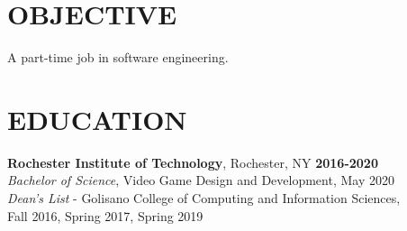 \documentclass[line,margin]{res}
\begin{document}

\noindent
\makebox[0pt][l]{}%
\makebox[\textwidth][c]{}%
\makebox[0pt][l]{}%
\makebox[\textwidth][c]{}%
\makebox[0pt][l]{}%
\makebox[\textwidth][c]{}%



\begin{resume}

\section{OBJECTIVE}
A part-time job in software engineering.



\section{EDUCATION}
\textbf{Rochester Institute of Technology}, Rochester, NY\hfill
    \textbf{2016-2020}\\
{\sl Bachelor of Science}, Video Game Design and Development, May 2020
\\
{\sl Dean's List} - Golisano College of Computing and Information Sciences,\hfill \\ Fall 2016, Spring 2017, Spring 2019

\end{resume}
\end{document}
